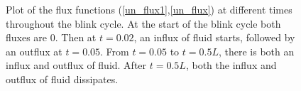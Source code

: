 \begin{figure}
	
	\caption{Plot of the flux functions (\ref{un_flux1},\ref{un_flux}) at different times throughout the blink cycle. At the start of the blink cycle both fluxes are 0. Then at $t=0.02$, an influx of fluid starts, followed by an outflux at $t=0.05$. From $t=0.05$ to $t=0.5 L$, there is both an influx and outflux of fluid. After $t=0.5 L$, both the influx and outflux of fluid dissipates.}
	\label{flux_plots}
\end{figure}

